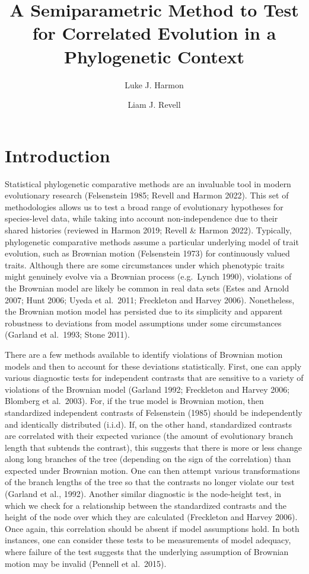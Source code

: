\documentclass[fleqn,10pt,lineno]{wlpeerj} %
\title{A Semiparametric Method to Test for Correlated Evolution in a Phylogenetic Context}
\author[1]{Luke J. Harmon}
\author[2]{Liam J. Revell}
\affil[1]{Department of Biological Sciences, University of Idaho, Moscow, ID, USA}
\affil[2]{Department of Biology, University of Massachusetts Boston, Boston, MA, USA}
\begin{document}
\flushbottom
\maketitle
\thispagestyle{empty}

\section{Introduction}\label{introduction}

Statistical phylogenetic comparative methods are an invaluable tool in modern evolutionary research (Felsenstein 1985; Revell and Harmon 2022). This set of methodologies allows us to test a broad range of evolutionary hypotheses for species-level data, while taking into account non-independence due to their shared histories (reviewed in Harmon 2019; Revell \& Harmon 2022). Typically, phylogenetic comparative methods assume a particular underlying model of trait evolution, such as Brownian motion (Felsenstein 1973) for continuously valued traits. Although there are some circumstances under which phenotypic traits might genuinely evolve via a Brownian process (e.g.~Lynch 1990), violations of the Brownian model are likely be common in real data sets (Estes and Arnold 2007; Hunt 2006; Uyeda et al.~2011; Freckleton and Harvey 2006). Nonetheless, the Brownian motion model has persisted due to its simplicity and apparent robustness to deviations from model assumptions under some circumstances (Garland et al.~1993; Stone 2011).

There are a few methods available to identify violations of Brownian motion models and then to account for these deviations statistically. First, one can apply various diagnostic tests for independent contrasts that are sensitive to a variety of violations of the Brownian model (Garland 1992; Freckleton and Harvey 2006; Blomberg et al.~2003). For, if the true model is Brownian motion, then standardized independent contrasts of Felsenstein (1985) should be independently and identically distributed (i.i.d). If, on the other hand, standardized contrasts are correlated with their expected variance (the amount of evolutionary branch length that subtends the contrast), this suggests that there is more or less change along long branches of the tree (depending on the sign of the correlation) than expected under Brownian motion. One can then attempt various transformations of the branch lengths of the tree so that the contrasts no longer violate our test (Garland et al., 1992). Another similar diagnostic is the node-height test, in which we check for a relationship between the standardized contrasts and the height of the node over which they are calculated (Freckleton and Harvey 2006). Once again, this correlation should be absent if model assumptions hold. In both instances, one can consider these tests to be measurements of model adequacy, where failure of the test suggests that the underlying assumption of Brownian motion may be invalid (Pennell et al.~2015).
\end{document}
